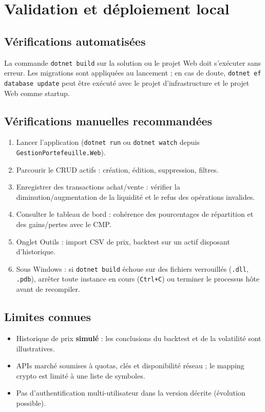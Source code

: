 \chapter{Validation et déploiement local}
\label{ch:val}

\section{Vérifications automatisées}

La commande \texttt{dotnet build} sur la solution ou le projet Web doit s'exécuter sans erreur. Les migrations sont appliquées au lancement ; en cas de doute, \texttt{dotnet ef database update} peut être exécuté avec le projet d'infrastructure et le projet Web comme startup.

\section{Vérifications manuelles recommandées}

\begin{enumerate}[leftmargin=*]
  \item Lancer l'application (\texttt{dotnet run} ou \texttt{dotnet watch} depuis \texttt{GestionPortefeuille.Web}).
  \item Parcourir le CRUD actifs : création, édition, suppression, filtres.
  \item Enregistrer des transactions achat/vente : vérifier la diminution/augmentation de la liquidité et le refus des opérations invalides.
  \item Consulter le tableau de bord : cohérence des pourcentages de répartition et des gains/pertes avec le CMP.
  \item Onglet Outils : import CSV de prix, backtest sur un actif disposant d'historique.
  \item Sous Windows : si \texttt{dotnet build} échoue sur des fichiers verrouillés (\texttt{.dll}, \texttt{.pdb}), arrêter toute instance en cours (\texttt{Ctrl+C}) ou terminer le processus hôte avant de recompiler.
\end{enumerate}

\section{Limites connues}

\begin{itemize}[leftmargin=*]
  \item Historique de prix \textbf{simulé} : les conclusions du backtest et de la volatilité sont illustratives.
  \item APIs marché soumises à quotas, clés et disponibilité réseau ; le mapping crypto est limité à une liste de symboles.
  \item Pas d'authentification multi-utilisateur dans la version décrite (évolution possible).
\end{itemize}
